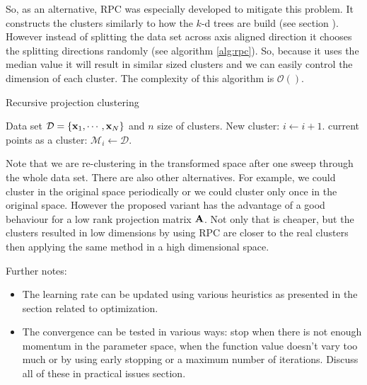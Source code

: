 \begin{enumerate}
	So, as an alternative, RPC was especially developed to mitigate this problem. It constructs the clusters similarly to how the $k$-d trees are build (see section ). However instead of splitting the data set across axis aligned direction it chooses the splitting directions randomly (see algorithm \ref{alg:rpc}). So, because it uses the median value it will result in similar sized clusters and we can easily control the dimension of each cluster. The complexity of this algorithm is $\mathcal{O}()$.
	
	\begin{algorithm} 
		\caption{Recursive projection clustering} 
		\label{alg:rpc}  
		\begin{algorithmic}                    %
			\REQUIRE Data set $\mathcal{D}=\{\mathbf{x}_1,\cdots,\mathbf{x}_N\}$ and $n$ size of clusters.
				\STATE New cluster: $i\leftarrow i+1$.
				\RETURN current points as a cluster: $\mathcal{M}_i \leftarrow \mathcal{D}$.
			\ELSE
			\ENDIF
		\end{algorithmic}
	\end{algorithm}
	
	Note that we are re-clustering in the transformed space after one sweep through the whole data set. There are also other alternatives. For example, we could cluster in the original space periodically or we could cluster only once in the original space. However the proposed variant has the advantage of a good behaviour for a low rank projection matrix $\mathbf{A}$. Not only that is cheaper, but the clusters resulted in low dimensions by using RPC are closer to the real clusters then applying the same method in a high dimensional space. 
	
	Further notes:
	\begin{itemize}
		\item The learning rate can be updated using various heuristics as presented in the section related to optimization.
		\item The convergence can be tested in various ways: stop when there is not enough momentum in the parameter space, when the function value doesn't vary too much or by using early stopping or a maximum number of iterations. Discuss all of these in practical issues section.
	\end{itemize}
	
\end{enumerate}

